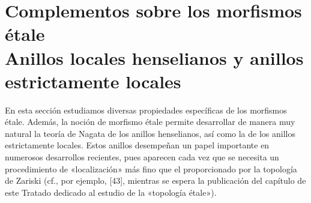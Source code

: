 \section[Complementos sobre los morfismos étale. Anillos locales henselianos y anillos estrictamente locales]{Complementos sobre los morfismos étale\\Anillos locales henselianos y anillos estrictamente locales}
\label{section:IV.18}

En esta sección estudiamos diversas propiedades específicas de los morfismos étale. Además, la noción de morfismo étale permite desarrollar de manera muy natural la teoría de Nagata de los anillos henselianos, así como la de los anillos estrictamente locales. Estos anillos desempeñan un papel importante en numerosos desarrollos recientes, pues aparecen cada vez que se necesita un procedimiento de «localización» más fino que el proporcionado por la topología de Zariski (cf., por ejemplo, [43], mientras se espera la publicación del capítulo de este Tratado dedicado al estudio de la «topología étale»).
